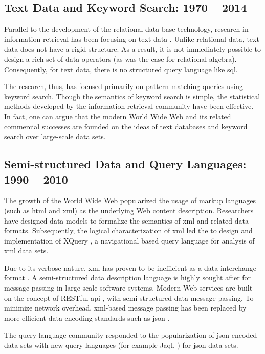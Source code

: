 	\subsection{Text Data and Keyword Search:  1970 -- 2014}
		Parallel to the development of the relational data base technology, research in information retrieval has been focusing on text data \cite{salton-88, jones-72}.  Unlike relational data, text data does not have a rigid structure.  As a result, it is not immediately possible to design a rich set of data operators (as was the case for relational algebra).  Consequently, for text data, there is no structured query language like \gls{sql}.
		
		The research, thus, has focused primarily on pattern matching queries using keyword search.  Though the semantics of keyword search is simple, the statistical methods developed by the information retrieval community \cite{salton-88, robertson-09, dumais-88} have been effective.  In fact, one can argue that the modern World Wide Web and its related commercial successes are founded on the ideas of text databases and keyword search over large-scale data sets.
		
	\subsection{Semi-structured Data and Query Languages:  1990 -- 2010}
		The growth of the World Wide Web popularized the usage of markup languages (such as \gls{html} and \gls{xml}) as the underlying Web content description.  Researchers have designed data models \cite{suciu-98} to formalize the semantics of \gls{xml} and related data formats.  Subsequently, the logical characterization of \gls{xml} led the to design and implementation of XQuery \cite{xquery-10}, a navigational based query language for analysis of \gls{xml} data sets.
		
		Due to its verbose nature, \gls{xml} has proven to be inefficient as a data interchange format \cite{schneider-14}.  A semi-structured data description language is highly sought after for message passing in large-scale software systems.  Modern Web services are built on the concept of RESTful \gls{api} \cite{restful-11}, with semi-structured data message passing.  To minimize network overhead, \gls{xml}-based message passing has been replaced by more efficient data encoding standards such as \gls{json} \cite{json}.
		
		The query language community responded to the popularization of \gls{json} encoded data sets with new query languages \cite{simeon-13} (for example Jaql, \cite{ibm-jaql}) for \gls{json} data sets.
	
